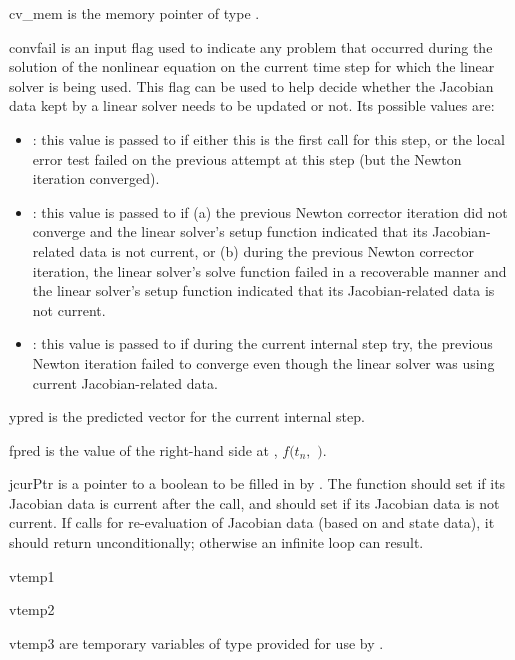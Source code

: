 {
   \begin{args}[convfail]
  
   \item[cv\_mem] 
     is the {\cvodes} memory pointer of type .
  
   \item[convfail]
     is an input flag used to indicate any problem that occurred during  
     the solution of the nonlinear equation on the current time step for which 
     the linear solver is being used. This flag can be used to help decide     
     whether the Jacobian data kept by a {\cvodes} linear solver needs to be updated 
     or not. Its possible values are:
     \begin{itemize}
     \item {}: this value is passed to  if 
       either this is the first call for this step, or the local error test failed
       on the previous attempt at this step (but the Newton iteration converged).
     \item {}: this value is passed to  if
       (a) the previous Newton corrector iteration did not converge and the linear
       solver's setup function indicated that its Jacobian-related data is not
       current, or                            
       (b) during the previous Newton corrector iteration, the linear solver's
       solve function failed in a recoverable manner and the linear solver's setup
       function indicated that its Jacobian-related data is not current.
     \item {}: this value is passed to  if 
       during the current internal step try, the previous Newton iteration
       failed to converge even though the linear solver was using current
       Jacobian-related data.
     \end{itemize}
  
   \item[ypred]
     is the predicted  vector for the current {\cvodes} internal step.
  
   \item[fpred]
     is the value of the right-hand side at , $f(t_n,$ $)$.
  
   \item[jcurPtr]
     is a pointer to a boolean to be filled in by .  
     The function should set  if its Jacobian 
     data is current after the call, and should set         
      if its Jacobian data is not current.   
     If  calls for re-evaluation of         
     Jacobian data (based on  and {\cvodes} state      
     data), it should return  unconditionally;
     otherwise an infinite loop can result.                
    
   \item[vtemp1] 
   \item[vtemp2]
   \item[vtemp3] 
     are temporary variables of type  provided for use by .
   \end{args}
}
